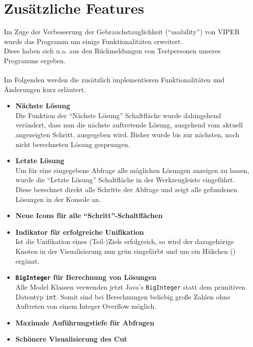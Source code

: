 \documentclass[parskip=full,11pt,twoside]{scrartcl}
\begin{document}
\section{Zusätzliche Features}

Im Zuge der Verbesserung der Gebrauchstauglichkeit (\enquote{usability}) von VIPER wurde das Programm um einige Funktionalitäten erweitert.\\
Diese haben sich u.a. aus den Rückmeldungen von Testpersonen unseres Programms ergeben.\\\\
Im Folgenden werden die zusätzlich implementieren Funktionalitäten und Änderungen kurz erläutert.

\begin{itemize}
  \item \textbf{Nächste Lösung}\\
        Die Funktion der \enquote{Nächste Lösung} Schaltfläche wurde dahingehend verändert, dass nun die nächste auftretende Lösung, ausgehend vom aktuell angezeigten Schritt, ausgegeben wird. Bisher wurde bis zur nächsten, noch nicht berechneten Lösung gesprungen.
  \item \textbf{Letzte Lösung}\\
        Um für eine eingegebene Abfrage alle möglichen Lösungen anzeigen zu lassen, wurde die \enquote{Letzte Lösung} Schaltfläche in der Werkzeugleiste eingeführt. Diese berechnet direkt alle Schritte der Abfrage und zeigt alle gefundenen Lösungen in der Konsole an.
  \item \textbf{Neue Icons für alle \enquote{Schritt}-Schaltflächen}\\
  \item \textbf{Indikator für erfolgreiche Unifikation}\\
        Ist die Unifikation eines (Teil-)Ziels erfolgreich, so wird der dazugehörige Knoten in der Visualisierung nun grün eingefärbt und um ein Häkchen () ergänzt.
  \item \textbf{\texttt{BigInteger} für Berechnung von Lösungen}\\
        Alle Model Klassen verwenden jetzt Java's \texttt{BigInteger} statt dem primitiven Datentyp \texttt{int}. Somit sind bei Berechnungen beliebig große Zahlen ohne Auftreten von einem Integer Overflow möglich.
  \item \textbf{Maximale Auführungstiefe für Abfragen}\\
  \item \textbf{Schönere Visualisierung des Cut}\\

\end{itemize}
\end{document}
